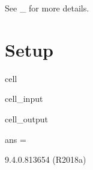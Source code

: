 \documentclass[letterpaper,10pt,english]{jupyterBook}
\begin{document}
\sphinxAtStartPar
See \_ for more details.


\section{Setup}
\label{\detokenize{testChpt/ePSproc_Matlab_demo_notebook_090821:setup}}
\begin{sphinxuseclass}{cell}\begin{sphinxVerbatimInput}

\begin{sphinxuseclass}{cell_input}
\begin{sphinxVerbatim}[commandchars=\\\{\}]
\end{sphinxVerbatim}

\end{sphinxuseclass}\end{sphinxVerbatimInput}
\begin{sphinxVerbatimOutput}

\begin{sphinxuseclass}{cell_output}
\begin{sphinxVerbatim}[commandchars=\\\{\}]
ans =

    \PYGZsq{}9.4.0.813654 (R2018a)\PYGZsq{}
\end{sphinxVerbatim}

\end{sphinxuseclass}\end{sphinxVerbatimOutput}

\end{sphinxuseclass}
\end{document}
